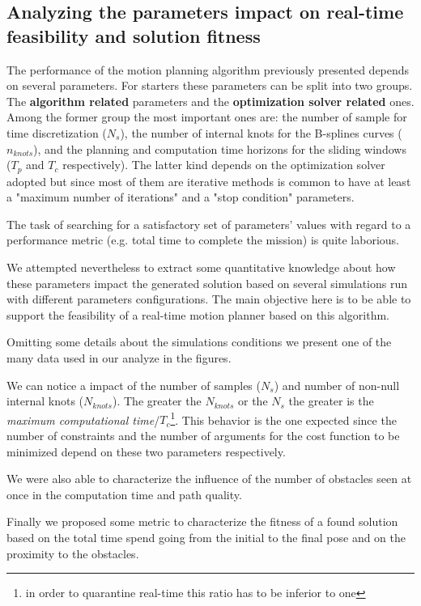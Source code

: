 \subsection{Analyzing the parameters impact on real-time feasibility and solution fitness}

The performance of the motion planning algorithm previously presented depends on several parameters. For starters these parameters can be split into two groups. The \textbf{algorithm related} parameters and the \textbf{optimization solver related} ones. Among the former group the most important ones are: the number of sample for time discretization ($N_s$), the number of internal knots for the B-splines curves ($n_{knots}$), and the planning and computation time horizons for the sliding windows ($T_p$ and $T_c$ respectively). The latter kind depends on the optimization solver adopted but since most of them are iterative methods is common to have at least a "maximum number of iterations" and a "stop condition" parameters.

The task of searching for a satisfactory set of parameters' values with regard to a performance metric (e.g. total time to complete the mission) is quite laborious.

We attempted nevertheless to extract some quantitative knowledge about how these parameters impact the generated solution based on several simulations run with different parameters configurations. The main objective here is to be able to support the feasibility of a real-time motion planner based on this algorithm.

Omitting some details about the simulations conditions we present one of the many data used in our analyze in the figures. 

We can notice a impact of the number of samples ($N_s$) and number of non-null internal knots ($N_{knots}$). The greater the $N_{knots}$ or the $N_s$ the greater is the \textit{maximum computational time}/$T_c$\footnote{in order to quarantine real-time this ratio has to be inferior to one}. This behavior is the one expected since the number of constraints and the number of arguments for the cost function to be minimized depend on these two parameters respectively.

We were also able to characterize the influence of the number of obstacles seen at once in the computation time and path quality.

Finally we proposed some metric to characterize the fitness of a found solution based on the total time spend going from the initial to the final pose and on the proximity to the obstacles.

